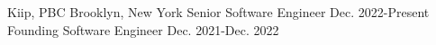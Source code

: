 

\begin{cventries}


  \nrolecventrynoitems
    {Kiip, PBC} %
    {Brooklyn, New York} %
    {Senior Software Engineer} %
    {Dec. 2022-Present} %
    {Founding Software Engineer} %
    {Dec. 2021-Dec. 2022} %
    {} %
    {} %


\end{cventries}

